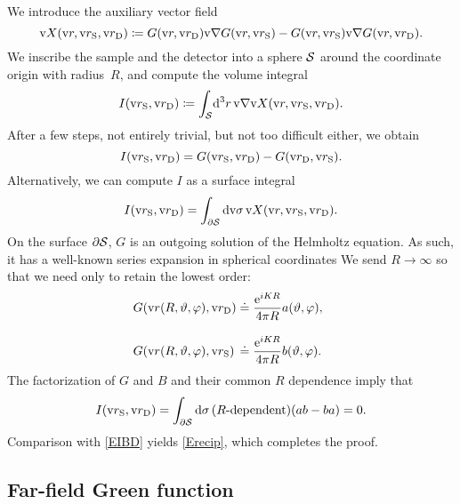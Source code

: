 We introduce the auxiliary vector field
\begin{equation}
  \text{v}{X}(\text{v}{r},\text{v}{r}_\text{S},\text{v}{r}_\text{D})\coloneqq G(\text{v}{r},\text{v}{r}_\text{D})\text{v}{\nabla} G(\text{v}{r},\text{v}{r}_\text{S}) - G(\text{v}{r},\text{v}{r}_\text{S})\text{v}{\nabla} G(\text{v}{r},\text{v}{r}_\text{D}).
\end{equation}
We inscribe the sample and the detector
into a sphere $\mathcal{S}$ around the coordinate origin with radius~$R$,
and compute the volume integral
\begin{equation}\label{Eprerecipro}
    I(\text{v}{r}_\text{S},\text{v}{r}_\text{D}) \coloneqq \displaystyle\int_{\mathcal{S}}\!\mathrm d^3r\,\text{v}{\nabla} \text{v}{X}(\text{v}{r},\text{v}{r}_\text{S},\text{v}{r}_\text{D}).
\end{equation}
After a few steps, not entirely trivial, but not too difficult either,
we obtain
\begin{equation}\label{EIBD}
  I(\text{v}{r}_\text{S},\text{v}{r}_\text{D}) = G(\text{v}{r}_\text{S},\text{v}{r}_\text{D}) - G(\text{v}{r}_\text{D},\text{v}{r}_\text{S}).
\end{equation}
Alternatively, we can compute $I$ as a surface integral
\begin{equation}
  I(\text{v}{r}_\text{S},\text{v}{r}_\text{D})
  =\displaystyle\int_{\partial\mathcal{S}}\mathrm d\text{v}{\sigma}\,\text{v}{X}(\text{v}{r},\text{v}{r}_\text{S},\text{v}{r}_\text{D}).
\end{equation}
On the surface $\partial\mathcal{S}$,
$G$ is an outgoing solution of the Helmholtz equation.
As such, it has a well-known series expansion in spherical coordinates
We send $R\to\infty$ so that we need only to retain the lowest order:
\begin{equation}
  \begin{array}{@{}l@{\;}c@{\;}l}
   G(\r(R,\vartheta,\varphi),\rD)
   &\doteq&\displaystyle \frac{\e^{iKR}}{4\pi R} a(\vartheta,\varphi),
   \\[3.8ex]
   G(\r(R,\vartheta,\varphi),\rS)
   &\doteq&\displaystyle \frac{\e^{iKR}}{4\pi R} b(\vartheta,\varphi).
  \end{array}
\end{equation}
The factorization of $G$ and $B$ and their common $R$ dependence imply that
\begin{equation}
  I(\text{v}{r}_\text{S},\text{v}{r}_\text{D})
  =\displaystyle\int_{\partial\mathcal{S}}\mathrm d\sigma\,
       (\text{$R$-dependent})(ab-ba)
  = 0.
\end{equation}
Comparison with \cref{EIBD} yields \cref{Erecip},
which completes the proof.

%

\subsection{Far-field Green function}\label{SfarDW}

